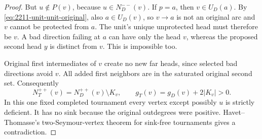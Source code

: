 \begin{proof}
But $u\notin P(v)$, because $u\in N_D^{--}(v)$.
If $p=a$, then $v\in U_D(a)$. By
\eqref{eq:2211-unit-unit-original}, also $a\in U_D(v)$,
so $v\to a$ is not an original arc and $v$ cannot be protected
from $a$. The unit's unique unprotected head must therefore be
$v$. A bad direction failing at $a$ can have only the head $v$,
whereas the proposed second head $y$ is distinct from $v$.
This is impossible too.

Original first intermediates of $v$ create no new far heads,
since selected bad directions avoid $v$.
All added first neighbors are in the saturated original second set.
Consequently
\[
 N_T^{++}(v)=N_D^{++}(v)\setminus K_v,
 \qquad g_T(v)=g_D(v)+2|K_v|>0.
\]
In this one fixed completed tournament every vertex except possibly
$u$ is strictly deficient. It has no sink because the original
outdegrees were positive. Havet--Thomasse's two-Seymour-vertex
theorem for sink-free tournaments gives a contradiction.
\end{proof}

